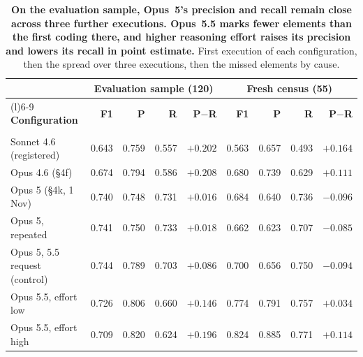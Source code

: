 \begin{table}[htbp]
\centering
\scriptsize
\setlength{\tabcolsep}{4.2pt}
\begin{threeparttable}
\caption[Opus 5.5, its control and repeated executions]{\textbf{On the evaluation sample, Opus~5's precision and recall remain close across three further executions. Opus~5.5 marks fewer elements than the first coding there, and higher reasoning effort raises its precision and lowers its recall in point estimate.} First execution of each configuration, then the spread over three executions, then the missed elements by cause.}
\label{tab:opus55}
\begin{tabular}{@{}>{\raggedright\arraybackslash}p{42mm}rrrrrrrr@{}}
\toprule
 & \multicolumn{4}{c}{\textbf{Evaluation sample (120)}} & \multicolumn{4}{c}{\textbf{Fresh census (55)}} \\
\cmidrule(lr){2-5}\cmidrule(l){6-9}
\textbf{Configuration} & \textbf{F1} & \textbf{P} & \textbf{R} & \textbf{P$-$R} & \textbf{F1} & \textbf{P} & \textbf{R} & \textbf{P$-$R} \\
\midrule
\multicolumn{9}{@{}l}{\textit{(a) First execution}} \\
Sonnet 4.6 (registered) & 0.643 & 0.759 & 0.557 & $+0.202$ & 0.563 & 0.657 & 0.493 & $+0.164$ \\
Opus 4.6 (\S4f) & 0.674 & 0.794 & 0.586 & $+0.208$ & 0.680 & 0.739 & 0.629 & $+0.111$ \\
Opus 5 (\S4k, 1 Nov) & 0.740 & 0.748 & 0.731 & $+0.016$ & 0.684 & 0.640 & 0.736 & $-0.096$ \\
Opus 5, repeated & 0.741 & 0.750 & 0.733 & $+0.018$ & 0.662 & 0.623 & 0.707 & $-0.085$ \\
Opus 5, 5.5 request (control) & 0.744 & 0.789 & 0.703 & $+0.086$ & 0.700 & 0.656 & 0.750 & $-0.094$ \\
Opus 5.5, effort low & 0.726 & 0.806 & 0.660 & $+0.146$ & 0.774 & 0.791 & 0.757 & $+0.034$ \\
Opus 5.5, effort high & 0.709 & 0.820 & 0.624 & $+0.196$ & 0.824 & 0.885 & 0.771 & $+0.114$ \\

\end{tabular}
\end{threeparttable}
\end{table}
